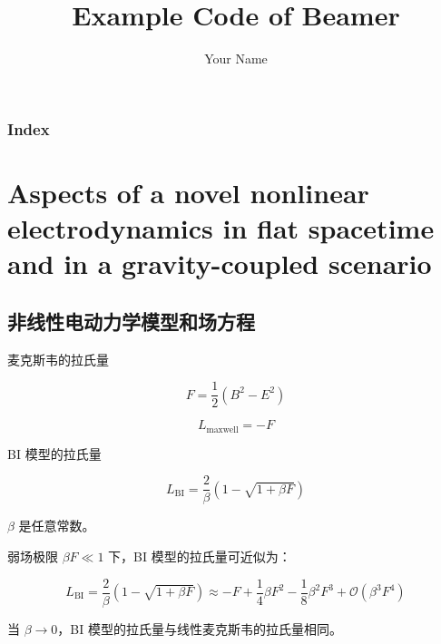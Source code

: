 \documentclass[9pt, dvipsnames]{beamer} %
\title{Example Code of Beamer} %
\author[Your Name]{Your Name} %
\date{} %
\begin{document}
\everymath{\displaystyle}

\begin{frame}
    \titlepage %
\end{frame}

\begin{frame}
    \frametitle{\textbf{Index}}
    \begin{multicols}{2}
    \tableofcontents
    \end{multicols}
\end{frame}



\section{Aspects of a novel nonlinear electrodynamics in flat spacetime and in a gravity-coupled scenario}




\subsection{非线性电动力学模型和场方程}

\begin{frame}

麦克斯韦的拉氏量

$$
F
=\frac{1 }{2 } (B^2-E^2)
$$

$$
L_{\mathrm{maxwell}}
=-F
$$

BI 模型的拉氏量

$$
L_{\mathrm{BI}}
=\frac{2 }{\beta } \left(1-\sqrt{1+\beta F} \right) 
$$

$\beta $ 是任意常数。

弱场极限 $\beta F\ll 1 $ 下，BI 模型的拉氏量可近似为：

$$
L_{\mathrm{BI}}
=\frac{2 }{\beta } \left(1-\sqrt{1+\beta F} \right)
\approx -F + \frac{1 }{4 } \beta F^2 - \frac{1 }{8 } \beta^2 F^3 +\mathcal{O}\left(\beta^3 F^4 \right) 
$$

当 $\beta\to 0 $，BI 模型的拉氏量与线性麦克斯韦的拉氏量相同。

\end{frame}
\end{document}
